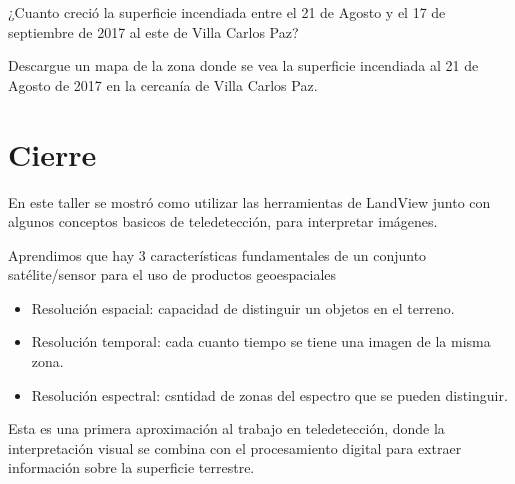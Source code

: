 \documentclass[a4paper,12pt]{book}
\begin{document}
\begin{que}
    ¿Cuanto creció la superficie incendiada entre el 21 de Agosto y el 17 de septiembre de 2017 al este de Villa Carlos Paz?
\end{que}

\begin{que}
    Descargue un mapa de la zona donde se vea la superficie incendiada al 21 de Agosto de 2017 en la cercanía de Villa Carlos Paz.
\end{que}

\chapter{Cierre}

En este taller se mostró como utilizar las herramientas de LandView junto con algunos conceptos basicos de teledetección, para interpretar imágenes.

Aprendimos que hay 3 características fundamentales de un conjunto satélite/sensor para el uso de productos geoespaciales

\begin{itemize}
    \item Resolución espacial: capacidad de distinguir un objetos en el terreno.
    \item Resolución temporal: cada cuanto tiempo se tiene una imagen de la misma zona.
    \item Resolución espectral: csntidad de zonas del espectro que se pueden distinguir.
\end{itemize}

Esta es una primera aproximación al trabajo en teledetección, donde la interpretación visual se combina con el procesamiento digital para extraer información sobre la superficie terrestre. 
\end{document}
